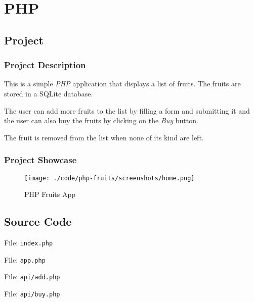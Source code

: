 \section{PHP}\label{sec:php}

\subsection{Project}

\subsubsection*{Project Description}

This is a simple \textit{PHP} application\cite[GitHub]{php-fruits} that displays a list of fruits. The fruits are stored in a SQLite database.

The user can add more fruits to the list by filling a form and submitting it and the user can also buy the fruits by clicking on the \textit{Buy} button.

The fruit is removed from the list when none of its kind are left.

\subsubsection*{Project Showcase}

\begin{figure}[htbp]
    \centering
    \texttt{[image: ./code/php-fruits/screenshots/home.png]}
    \caption{PHP Fruits App}
    \label{fig:php}
\end{figure}


\subsection{Source Code}

File: \texttt{index.php}

File: \texttt{app.php}

\pagebreak

File: \texttt{api/add.php}

File: \texttt{api/buy.php}
